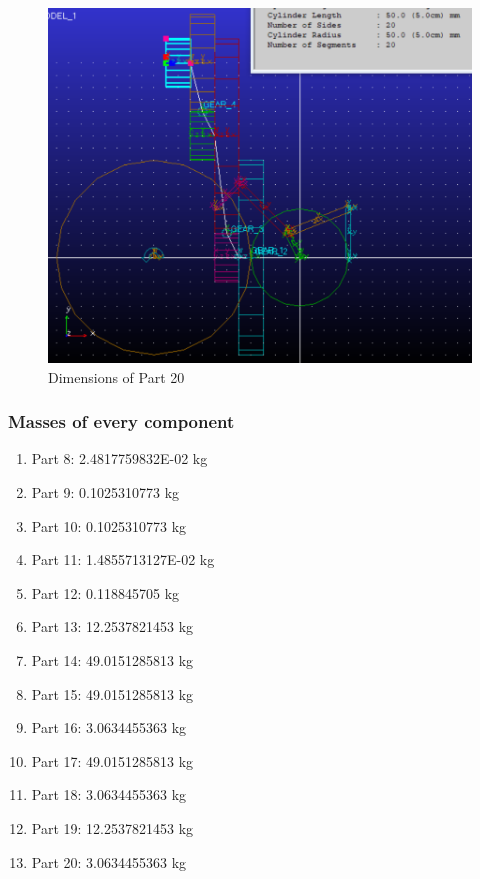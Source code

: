                 \begin{figure}[hbt!]
                    \centering
                    \includegraphics[width=0.9\columnwidth]{Images/dim20.png}
                    \caption{Dimensions of Part 20}
                    \label{fig:dim20}
                \end{figure}

            \subsubsection{Masses of every component}
                \begin{enumerate}
                    \item Part 8: 2.4817759832E-02 kg
                    \item Part 9: 0.1025310773 kg
                    \item Part 10: 0.1025310773 kg
                    \item Part 11: 1.4855713127E-02 kg
                    \item Part 12: 0.118845705 kg
                    \item Part 13: 12.2537821453 kg
                    \item Part 14: 49.0151285813 kg
                    \item Part 15: 49.0151285813 kg
                    \item Part 16: 3.0634455363 kg
                    \item Part 17: 49.0151285813 kg
                    \item Part 18: 3.0634455363 kg
                    \item Part 19: 12.2537821453 kg
                    \item Part 20: 3.0634455363 kg
                \end{enumerate}

